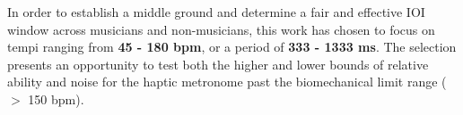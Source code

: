 In order to establish a middle ground and determine a fair and effective IOI window across musicians and non-musicians, this work has chosen to focus on tempi ranging from \textbf{45 - 180 bpm}, or a period of \textbf{333 - 1333 ms}. The selection presents an opportunity to test both the higher and lower bounds of relative ability and noise for the haptic metronome past the biomechanical limit range ($>$ 150 bpm).